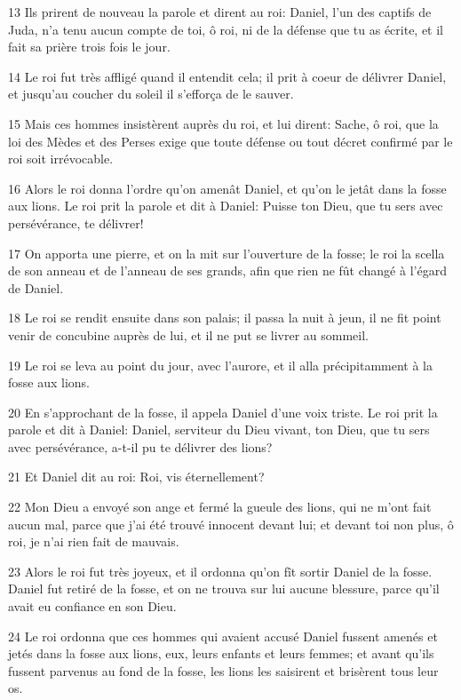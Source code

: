 \par 13 Ils prirent de nouveau la parole et dirent au roi: Daniel, l'un des captifs de Juda, n'a tenu aucun compte de toi, ô roi, ni de la défense que tu as écrite, et il fait sa prière trois fois le jour.
\par 14 Le roi fut très affligé quand il entendit cela; il prit à coeur de délivrer Daniel, et jusqu'au coucher du soleil il s'efforça de le sauver.
\par 15 Mais ces hommes insistèrent auprès du roi, et lui dirent: Sache, ô roi, que la loi des Mèdes et des Perses exige que toute défense ou tout décret confirmé par le roi soit irrévocable.
\par 16 Alors le roi donna l'ordre qu'on amenât Daniel, et qu'on le jetât dans la fosse aux lions. Le roi prit la parole et dit à Daniel: Puisse ton Dieu, que tu sers avec persévérance, te délivrer!
\par 17 On apporta une pierre, et on la mit sur l'ouverture de la fosse; le roi la scella de son anneau et de l'anneau de ses grands, afin que rien ne fût changé à l'égard de Daniel.
\par 18 Le roi se rendit ensuite dans son palais; il passa la nuit à jeun, il ne fit point venir de concubine auprès de lui, et il ne put se livrer au sommeil.
\par 19 Le roi se leva au point du jour, avec l'aurore, et il alla précipitamment à la fosse aux lions.
\par 20 En s'approchant de la fosse, il appela Daniel d'une voix triste. Le roi prit la parole et dit à Daniel: Daniel, serviteur du Dieu vivant, ton Dieu, que tu sers avec persévérance, a-t-il pu te délivrer des lions?
\par 21 Et Daniel dit au roi: Roi, vis éternellement?
\par 22 Mon Dieu a envoyé son ange et fermé la gueule des lions, qui ne m'ont fait aucun mal, parce que j'ai été trouvé innocent devant lui; et devant toi non plus, ô roi, je n'ai rien fait de mauvais.
\par 23 Alors le roi fut très joyeux, et il ordonna qu'on fît sortir Daniel de la fosse. Daniel fut retiré de la fosse, et on ne trouva sur lui aucune blessure, parce qu'il avait eu confiance en son Dieu.
\par 24 Le roi ordonna que ces hommes qui avaient accusé Daniel fussent amenés et jetés dans la fosse aux lions, eux, leurs enfants et leurs femmes; et avant qu'ils fussent parvenus au fond de la fosse, les lions les saisirent et brisèrent tous leur os.
